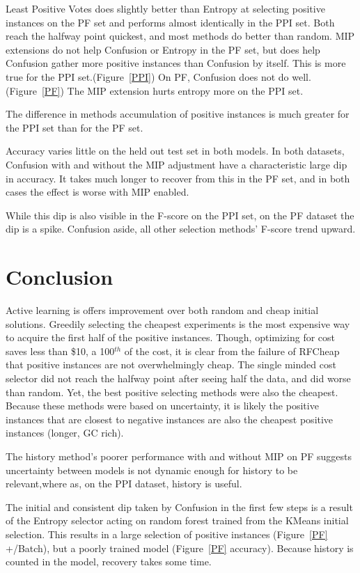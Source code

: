 \documentclass[10pt,a4pape r]{article}
\begin{document}
Least Positive Votes does slightly better than Entropy at selecting positive instances on the PF set and performs almost identically in the PPI set. Both reach the halfway point quickest, and most methods do better than random. MIP extensions do not help Confusion or Entropy in the PF set, but does help Confusion gather more positive instances than Confusion by itself. This is more true for the PPI set.(Figure~\ref{PPI}) On PF, Confusion does not do well. (Figure~\ref{PF}) The MIP extension hurts entropy more on the PPI set.
 
 The difference in methods accumulation of positive instances is much greater for the PPI set than for the PF set.

 Accuracy varies little on the held out test set in both models. In both datasets, Confusion with and without the MIP adjustment have a characteristic large dip in accuracy. It takes much longer to recover from this in the PF set, and in both cases the effect is worse with MIP enabled.
 
 While this dip is also visible in the F-score on the PPI set, on the PF dataset the dip is a spike. Confusion aside, all other selection methods' F-score trend upward.


 \section{Conclusion}
Active learning is offers improvement over both random and cheap initial solutions. Greedily selecting the cheapest experiments is the most expensive way to acquire the first half of the positive instances. Though, optimizing for cost saves less than \$10, a 100$^{th}$ of the cost, it is clear from the failure of RFCheap that positive instances are not overwhelmingly cheap. The single minded cost selector did not reach the halfway point after seeing half the data, and did worse than random. Yet, the best positive selecting methods were also the cheapest. Because these methods were based on uncertainty, it is likely the positive instances that are closest to negative instances are also the cheapest positive instances (longer, GC rich). 


 The history method's poorer performance with and without MIP on PF suggests uncertainty between models is not dynamic enough for history to be relevant,where as, on the PPI dataset, history is useful.

 The initial and consistent dip taken by Confusion in the first few steps is a result of the Entropy selector acting on random forest trained from the KMeans initial selection. This results in a large selection of positive instances (Figure~\ref{PF} +/Batch), but a poorly trained model (Figure~\ref{PF} accuracy). Because history is counted in the model, recovery takes some time.
\end{document}
